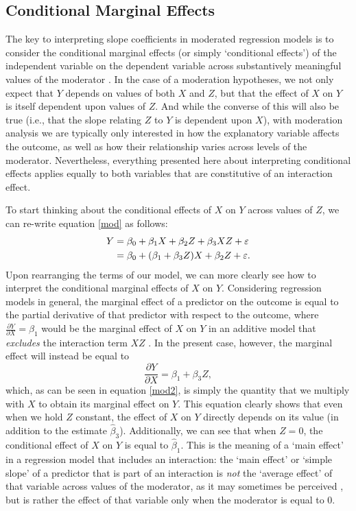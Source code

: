 \subsection{Conditional Marginal Effects}
The key to interpreting slope coefficients in moderated regression models is to consider the conditional marginal effects (or simply `conditional effects') of the independent variable on the dependent variable across substantively meaningful values of the moderator \cite{wright1976linear,friedrich1982defense}. In the case of a moderation hypotheses, we not only expect that $Y$ depends on values of both $X$ and $Z$, but that the effect of $X$ on $Y$ is itself dependent upon values of $Z$. And while the converse of this will also be true (i.e., that the slope relating $Z$ to $Y$ is dependent upon $X$), with moderation analysis we are typically only interested in how the explanatory variable affects the outcome, as well as how their relationship varies across levels of the moderator. Nevertheless, everything presented here about interpreting conditional effects applies equally to both variables that are constitutive of an interaction effect.

To start thinking about the conditional effects of $X$ on $Y$ across values of $Z$, we can re-write equation \ref{mod} as follows:
\begin{equation} \label{mod2}
    \begin{split}
        Y &= \beta_0 + \beta_1 X + \beta_2 Z + \beta_3 X Z + \varepsilon \\
        &= \beta_0 + (\beta_1 + \beta_3 Z) X + \beta_2 Z + \varepsilon.
    \end{split}
\end{equation}
Upon rearranging the terms of our model, we can more clearly see how to interpret the conditional marginal effects of $X$ on $Y$. Considering regression models in general, the marginal effect of a predictor on the outcome is equal to the partial derivative of that predictor with respect to the outcome, where $\frac{\partial Y}{\partial X} = \beta_1$ would be the marginal effect of $X$ on $Y$ in an additive model that \textit{excludes} the interaction term $XZ$ \cite{brambor2006understanding,friedrich1982defense}. In the present case, however, the marginal effect will instead be equal to
\begin{equation} \label{marg}
    \frac{\partial Y}{\partial X} = \beta_1 + \beta_3 Z,
\end{equation}
which, as can be seen in equation \ref{mod2}, is simply the quantity that we multiply with $X$ to obtain its marginal effect on $Y$. This equation clearly shows that even when we hold $Z$ constant, the effect of $X$ on $Y$ directly depends on its value (in addition to the estimate $\hat{\beta}_3$). Additionally, we can see that when $Z = 0$, the conditional effect of $X$ on $Y$ is equal to $\hat{\beta}_1$. This is the meaning of a `main effect' in a regression model that includes an interaction: the `main effect' or `simple slope' of a predictor that is part of an interaction is \textit{not} the `average effect' of that variable across values of the moderator, as it may sometimes be perceived \cite{friedrich1982defense}, but is rather the effect of that variable only when the moderator is equal to 0. 

